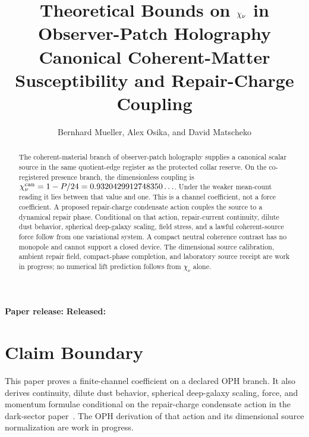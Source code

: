 \documentclass[11pt]{article}
\title{\textbf{Theoretical Bounds on \(\chi_\nu\) in Observer-Patch Holography}\\
\large Canonical Coherent-Matter Susceptibility and Repair-Charge Coupling}
\author{Bernhard Mueller, Alex Osika, and David Matscheko}
\date{\OPHPaperReleaseDate}
\numberwithin{equation}{section}
\theoremstyle{remark}
\begin{document}
\maketitle
\begin{center}
\small\textbf{Paper release:} \OPHPaperReleaseID\quad
\textbf{Released:} \OPHPaperReleaseDate
\end{center}

\begin{abstract}
The coherent-material branch of observer-patch holography supplies a canonical
scalar source in the same quotient-edge register as the protected collar
reserve. On the co-registered presence branch, the dimensionless coupling is
\(\chi_\nu^{\rm can}=1-P/24=0.9320429912748350\ldots\). Under the weaker
mean-count reading it lies between that value and one. This is a channel
coefficient, not a force coefficient. A proposed repair-charge condensate
action couples the source to a dynamical repair phase. Conditional on that
action, repair-current continuity, dilute dust behavior, spherical deep-galaxy
scaling, field stress, and a lawful coherent-source force follow from one
variational system. A compact neutral coherence contrast has no monopole and
cannot support a closed device. The dimensional source calibration, ambient
repair field, compact-phase completion, and laboratory source receipt are work
in progress; no numerical lift prediction follows from \(\chi_\nu\) alone.
\end{abstract}

\section*{Claim Boundary}

This paper proves a finite-channel coefficient on a declared OPH branch. It
also derives continuity, dilute dust behavior, spherical deep-galaxy scaling,
force, and momentum formulae conditional on the repair-charge condensate
action in the dark-sector paper~\cite{oph-dark}. The OPH derivation of that
action and its dimensional source normalization are work in progress.
\end{document}
